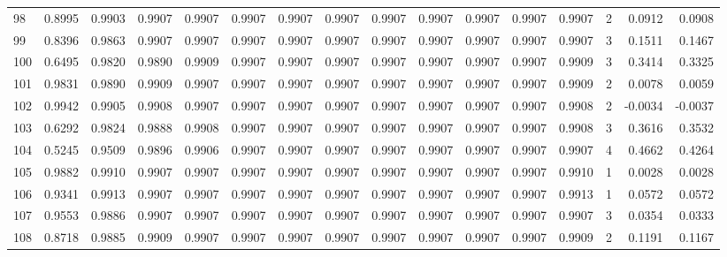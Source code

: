 \begin{tabular}{lrrrrrrrrrrrrrrr}
98  &      0.8995 &  0.9903 &  0.9907 &  0.9907 &  0.9907 &  0.9907 &  0.9907 &  0.9907 &  0.9907 &  0.9907 &   0.9907 &     0.9907 &      2 &                    0.0912 &                     0.0908 \\
99  &      0.8396 &  0.9863 &  0.9907 &  0.9907 &  0.9907 &  0.9907 &  0.9907 &  0.9907 &  0.9907 &  0.9907 &   0.9907 &     0.9907 &      3 &                    0.1511 &                     0.1467 \\
100 &      0.6495 &  0.9820 &  0.9890 &  0.9909 &  0.9907 &  0.9907 &  0.9907 &  0.9907 &  0.9907 &  0.9907 &   0.9907 &     0.9909 &      3 &                    0.3414 &                     0.3325 \\
101 &      0.9831 &  0.9890 &  0.9909 &  0.9907 &  0.9907 &  0.9907 &  0.9907 &  0.9907 &  0.9907 &  0.9907 &   0.9907 &     0.9909 &      2 &                    0.0078 &                     0.0059 \\
102 &      0.9942 &  0.9905 &  0.9908 &  0.9907 &  0.9907 &  0.9907 &  0.9907 &  0.9907 &  0.9907 &  0.9907 &   0.9907 &     0.9908 &      2 &                   -0.0034 &                    -0.0037 \\
103 &      0.6292 &  0.9824 &  0.9888 &  0.9908 &  0.9907 &  0.9907 &  0.9907 &  0.9907 &  0.9907 &  0.9907 &   0.9907 &     0.9908 &      3 &                    0.3616 &                     0.3532 \\
104 &      0.5245 &  0.9509 &  0.9896 &  0.9906 &  0.9907 &  0.9907 &  0.9907 &  0.9907 &  0.9907 &  0.9907 &   0.9907 &     0.9907 &      4 &                    0.4662 &                     0.4264 \\
105 &      0.9882 &  0.9910 &  0.9907 &  0.9907 &  0.9907 &  0.9907 &  0.9907 &  0.9907 &  0.9907 &  0.9907 &   0.9907 &     0.9910 &      1 &                    0.0028 &                     0.0028 \\
106 &      0.9341 &  0.9913 &  0.9907 &  0.9907 &  0.9907 &  0.9907 &  0.9907 &  0.9907 &  0.9907 &  0.9907 &   0.9907 &     0.9913 &      1 &                    0.0572 &                     0.0572 \\
107 &      0.9553 &  0.9886 &  0.9907 &  0.9907 &  0.9907 &  0.9907 &  0.9907 &  0.9907 &  0.9907 &  0.9907 &   0.9907 &     0.9907 &      3 &                    0.0354 &                     0.0333 \\
108 &      0.8718 &  0.9885 &  0.9909 &  0.9907 &  0.9907 &  0.9907 &  0.9907 &  0.9907 &  0.9907 &  0.9907 &   0.9907 &     0.9909 &      2 &                    0.1191 &                     0.1167 \\

\end{tabular}
